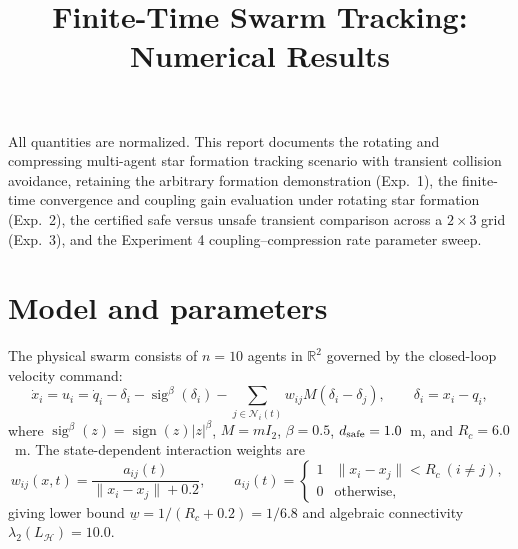 \documentclass[10pt]{article}
\title{Finite-Time Swarm Tracking: Numerical Results}
\author{}\date{}
\begin{document}
\maketitle\vspace{-2em}

All quantities are normalized. This report documents the rotating and compressing
multi-agent star formation tracking scenario with transient collision avoidance,
retaining the arbitrary formation demonstration (Exp.~1), the finite-time convergence
and coupling gain evaluation under rotating star formation (Exp.~2), the certified
safe versus unsafe transient comparison across a $2 \times 3$ grid (Exp.~3), and the
Experiment 4 coupling--compression rate parameter sweep.

\section{Model and parameters}
The physical swarm consists of $n = 10$ agents in $\mathbb{R}^2$ governed by the closed-loop velocity command:
\[
\dot x_i = u_i = \dot q_i - \delta_i - \operatorname{sig}^{\beta}(\delta_i)
- \sum_{j \in \mathcal{N}_i(t)} w_{ij} M (\delta_i - \delta_j), \qquad \delta_i = x_i - q_i,
\]
where $\operatorname{sig}^{\beta}(z) = \operatorname{sign}(z)|z|^{\beta}$, $M = m I_2$, $\beta = 0.5$, $d_{\rm safe} = 1.0$~m, and $R_c = 6.0$~m.
The state-dependent interaction weights are
\[
w_{ij}(x, t) = \frac{a_{ij}(t)}{\|x_i - x_j\| + 0.2}, \qquad
a_{ij}(t) = \begin{cases} 1 & \|x_i - x_j\| < R_c \ (i \neq j), \\ 0 & \text{otherwise}, \end{cases}
\]
giving lower bound $\underline{w} = 1 / (R_c + 0.2) = 1/6.8$ and algebraic connectivity $\lambda_2(L_{\mathcal{H}}) = 10.0$.
\end{document}
